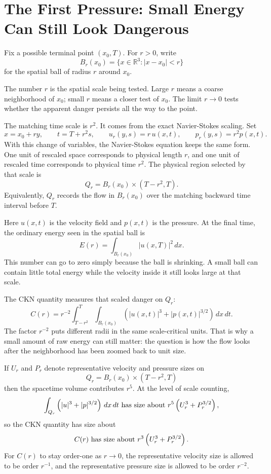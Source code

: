 \documentclass[11pt]{article}
\newcommand{\R}{\mathbb R}
\newcommand{\dd}{\,d}
\begin{document}
\section{The First Pressure: Small Energy Can Still Look Dangerous}

Fix a possible terminal point \((x_0,T)\). For \(r>0\), write
\[
B_r(x_0)=\{x\in\R^3: |x-x_0|<r\}
\]
for the spatial ball of radius \(r\) around \(x_0\).

The number \(r\) is the spatial scale being tested. Large \(r\) means a coarse neighborhood of \(x_0\); small \(r\) means a closer test of \(x_0\). The limit \(r\to0\) tests whether the apparent danger persists all the way to the point.

The matching time scale is \(r^2\). It comes from the exact Navier-Stokes scaling. Set
\[
x=x_0+ry,
\qquad
t=T+r^2s,
\qquad
u_r(y,s)=r\,u(x,t),
\qquad
p_r(y,s)=r^2p(x,t).
\]
With this change of variables, the Navier-Stokes equation keeps the same form. One unit of rescaled space corresponds to physical length \(r\), and one unit of rescaled time corresponds to physical time \(r^2\). The physical region selected by that scale is
\[
Q_r=B_r(x_0)\times(T-r^2,T).
\]
Equivalently, \(Q_r\) records the flow in \(B_r(x_0)\) over the matching backward time interval before \(T\).

Here \(u(x,t)\) is the velocity field and \(p(x,t)\) is the pressure. At the final time, the ordinary energy seen in the spatial ball is
\[
E(r)=\int_{B_r(x_0)} |u(x,T)|^2\dd x .
\]
This number can go to zero simply because the ball is shrinking. A small ball can contain little total energy while the velocity inside it still looks large at that scale.

The CKN quantity measures that scaled danger on \(Q_r\):
\[
C(r)=r^{-2}\int_{T-r^2}^{T}\int_{B_r(x_0)}
\left(|u(x,t)|^3+|p(x,t)|^{3/2}\right)\dd x\dd t .
\]
The factor \(r^{-2}\) puts different radii in the same scale-critical units. That is why a small amount of raw energy can still matter: the question is how the flow looks after the neighborhood has been zoomed back to unit size.

If \(U_r\) and \(P_r\) denote representative velocity and pressure sizes on
\[
Q_r=B_r(x_0)\times(T-r^2,T)
\]
then the spacetime volume contributes \(r^5\). At the level of scale counting,
\[
\int_{Q_r}\left(|u|^3+|p|^{3/2}\right)\dd x\dd t
\hbox{ has size about } r^5\left(U_r^3+P_r^{3/2}\right),
\]
so the CKN quantity has size about
\[
C(r)\hbox{ has size about } r^3\left(U_r^3+P_r^{3/2}\right).
\]
For \(C(r)\) to stay order-one as \(r\to0\), the representative velocity size is allowed to be order \(r^{-1}\), and the representative pressure size is allowed to be order \(r^{-2}\).
\end{document}
